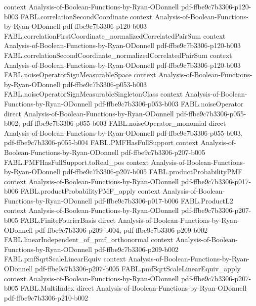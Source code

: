 \begin{theorem}
  {context}
  {Analysis-of-Boolean-Functions-by-Ryan-ODonnell}
  {pdf-ffbe9c7b3306-p120-b003}
\proofstep
  {FABL.correlationSecondCoordinate}
  {context}
  {Analysis-of-Boolean-Functions-by-Ryan-ODonnell}
  {pdf-ffbe9c7b3306-p120-b003}
\proofstep
  {FABL.correlationFirstCoordinate_normalizedCorrelatedPairSum}
  {context}
  {Analysis-of-Boolean-Functions-by-Ryan-ODonnell}
  {pdf-ffbe9c7b3306-p120-b003}
\proofstep
  {FABL.correlationSecondCoordinate_normalizedCorrelatedPairSum}
  {context}
  {Analysis-of-Boolean-Functions-by-Ryan-ODonnell}
  {pdf-ffbe9c7b3306-p120-b003}
\proofstep
  {FABL.noiseOperatorSignMeasurableSpace}
  {context}
  {Analysis-of-Boolean-Functions-by-Ryan-ODonnell}
  {pdf-ffbe9c7b3306-p053-b003}
\proofstep
  {FABL.noiseOperatorSignMeasurableSingletonClass}
  {context}
  {Analysis-of-Boolean-Functions-by-Ryan-ODonnell}
  {pdf-ffbe9c7b3306-p053-b003}
\proofstep
  {FABL.noiseOperator}
  {direct}
  {Analysis-of-Boolean-Functions-by-Ryan-ODonnell}
  {pdf-ffbe9c7b3306-p055-b002,
    pdf-ffbe9c7b3306-p055-b003}
\proofstep
  {FABL.noiseOperator_monomial}
  {direct}
  {Analysis-of-Boolean-Functions-by-Ryan-ODonnell}
  {pdf-ffbe9c7b3306-p055-b003,
    pdf-ffbe9c7b3306-p055-b004}
\proofstep
  {FABL.PMFHasFullSupport}
  {context}
  {Analysis-of-Boolean-Functions-by-Ryan-ODonnell}
  {pdf-ffbe9c7b3306-p207-b005}
\proofstep
  {FABL.PMFHasFullSupport.toReal_pos}
  {context}
  {Analysis-of-Boolean-Functions-by-Ryan-ODonnell}
  {pdf-ffbe9c7b3306-p207-b005}
\proofstep
  {FABL.productProbabilityPMF}
  {context}
  {Analysis-of-Boolean-Functions-by-Ryan-ODonnell}
  {pdf-ffbe9c7b3306-p017-b006}
\proofstep
  {FABL.productProbabilityPMF_apply}
  {context}
  {Analysis-of-Boolean-Functions-by-Ryan-ODonnell}
  {pdf-ffbe9c7b3306-p017-b006}
\proofstep
  {FABL.ProductL2}
  {context}
  {Analysis-of-Boolean-Functions-by-Ryan-ODonnell}
  {pdf-ffbe9c7b3306-p207-b005}
\proofstep
  {FABL.FiniteFourierBasis}
  {direct}
  {Analysis-of-Boolean-Functions-by-Ryan-ODonnell}
  {pdf-ffbe9c7b3306-p209-b004,
    pdf-ffbe9c7b3306-p209-b002}
\proofstep
  {FABL.linearIndependent_of_pmf_orthonormal}
  {context}
  {Analysis-of-Boolean-Functions-by-Ryan-ODonnell}
  {pdf-ffbe9c7b3306-p209-b002}
\proofstep
  {FABL.pmfSqrtScaleLinearEquiv}
  {context}
  {Analysis-of-Boolean-Functions-by-Ryan-ODonnell}
  {pdf-ffbe9c7b3306-p207-b005}
\proofstep
  {FABL.pmfSqrtScaleLinearEquiv_apply}
  {context}
  {Analysis-of-Boolean-Functions-by-Ryan-ODonnell}
  {pdf-ffbe9c7b3306-p207-b005}
\proofstep
  {FABL.MultiIndex}
  {direct}
  {Analysis-of-Boolean-Functions-by-Ryan-ODonnell}
  {pdf-ffbe9c7b3306-p210-b002}

\end{theorem}

